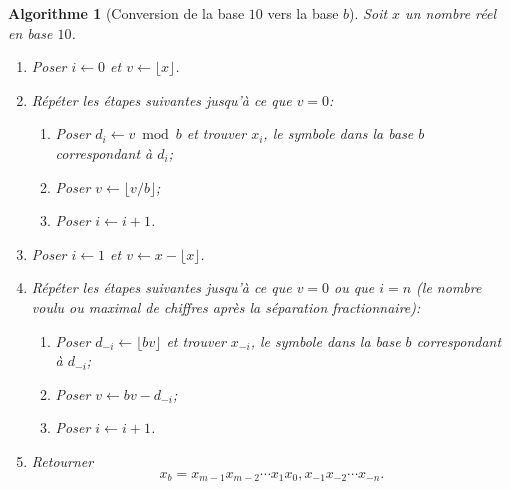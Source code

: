\documentclass[letterpaper,11pt,english,french]{memoir}
\theoremstyle{plain}
\newtheorem{algorithme}{Algorithme}[chapter]
\theoremstyle{definition}
\theoremstyle{remark}
\begin{document}
\begin{algorithme}[Conversion de la base $10$ vers la base $b$]
  \label{algo:ordinateurs:10_vers_b}
  Soit $x$ un nombre réel en base $10$.
  \begin{enumerate}
  \item Poser $i \leftarrow 0$ et $v \leftarrow \lfloor x \rfloor$.
  \item Répéter les étapes suivantes jusqu'à ce que $v = 0$:
    \begin{enumerate}
    \item Poser $d_i \leftarrow v \bmod b$ et trouver $x_i$, le
      symbole dans la base $b$ correspondant à $d_i$;
    \item Poser $v \leftarrow \lfloor v/b \rfloor$;
    \item Poser $i \leftarrow i + 1$.
    \end{enumerate}
  \item Poser $i \leftarrow 1$ et $v \leftarrow x - \lfloor x
    \rfloor$.
  \item Répéter les étapes suivantes jusqu'à ce que $v = 0$ ou que $i
    = n$ (le nombre voulu ou maximal de chiffres après la séparation
    fractionnaire):
    \begin{enumerate}
    \item Poser $d_{-i} \leftarrow \lfloor bv \rfloor$ et trouver $x_{-i}$, le
      symbole dans la base $b$ correspondant à $d_{-i}$;
    \item Poser $v \leftarrow bv - d_{-i}$;
    \item Poser $i \leftarrow i + 1$.
    \end{enumerate}
  \item Retourner
    \begin{displaymath}
      x_b = x_{m-1}x_{m-2} \cdots x_1x_0,x_{-1}x_{-2} \cdots x_{-n}.
    \end{displaymath}
  \end{enumerate}
\end{algorithme}
\end{document}

